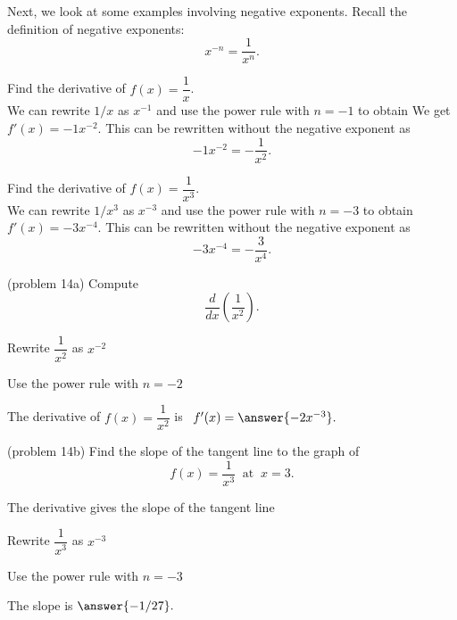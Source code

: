 \documentclass{ximera}
\begin{document}
Next, we look at some examples involving negative exponents. Recall the definition of negative exponents:
\[
x^{-n} = \frac{1}{x^n}.
\]



\begin{example}[example 13]
Find the derivative of $f(x) = \dfrac{1}{x}$.\\
We can rewrite $1/x$ as $x^{-1}$ and use the power rule with $n = -1$ to obtain 
We get $f'(x) = -1x^{-2}$.
This can be rewritten without the negative exponent as
\[ 
-1x^{-2} = -\frac{1}{x^2}.
\]
\end{example}



\begin{example}[example 14]
Find the derivative of $f(x) = \dfrac{1}{x^3}$.\\
We can rewrite $1/x^3$ as $x^{-3}$ and use the power rule with $n = -3$ to obtain 
$f'(x) = -3x^{-4}$.
This can be rewritten without the negative exponent as
\[
-3x^{-4} = -\frac{3}{x^4}.
\]
\end{example}




\begin{problem}(problem 14a)
Compute
\[
\frac{d}{dx} \left(\frac{1}{x^2}\right).
\]
\begin{hint}
Rewrite $\dfrac{1}{x^2}$ as $x^{-2}$
\end{hint}
\begin{hint}
Use the power rule with $n = -2$
\end{hint}
The derivative of $f(x) = \dfrac{1}{x^2}$ is \ $f'(x) = \answer{-2x^{-3}}.$
\end{problem}




\begin{problem}(problem 14b)
Find the slope of the tangent line to the graph of 
\[
f(x) = \frac{1}{x^3} \;\; \text{at} \;\; x = 3.
\]


\begin{hint}
The derivative gives the slope of the tangent line
\end{hint}
\begin{hint}
Rewrite $\dfrac{1}{x^3}$ as $x^{-3}$
\end{hint}
\begin{hint}
Use the power rule with $n = -3$
\end{hint}
The slope is  $\answer{-1/27}.$
\end{problem}
\end{document}
